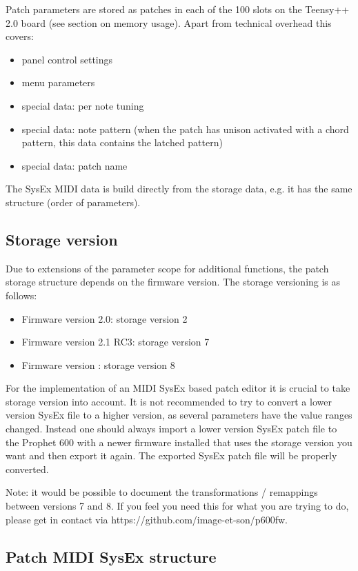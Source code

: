 Patch parameters are stored as patches in each of the 100 slots on the Teensy++ 2.0 board (see section on memory usage). Apart from technical overhead this covers:
\begin{itemize}
  \item panel control settings
  \item menu parameters
  \item special data: per note tuning
  \item special data: note pattern (when the patch has unison activated with a chord pattern, this data contains the latched pattern) 
  \item special data: patch name 
\end{itemize}

The SysEx MIDI data is build directly from the storage data, e.g. it has the same structure (order of parameters). 

\subsection{Storage version}

Due to extensions of the parameter scope for additional functions, the patch storage structure depends on the firmware version. The storage versioning is as follows:

\begin{itemize}
  \item Firmware version 2.0: storage version 2
  \item Firmware version 2.1 RC3: storage version 7
  \item Firmware version \version: storage version 8  
\end{itemize}

For the implementation of an MIDI SysEx based patch editor it is crucial to take storage version into account. It is not recommended to try to convert a lower version SysEx file to a higher version, as several parameters have the value ranges changed. Instead one should always import a lower version SysEx patch file to the Prophet 600 with a newer firmware installed that uses the storage version you want and then export it again. The exported SysEx patch file will be properly converted. 

Note: it would be possible to document the transformations / remappings between versions 7 and 8. If you feel you need this for what you are trying to do, please get in contact via https://github.com/image-et-son/p600fw.

\subsection{Patch MIDI SysEx structure}

